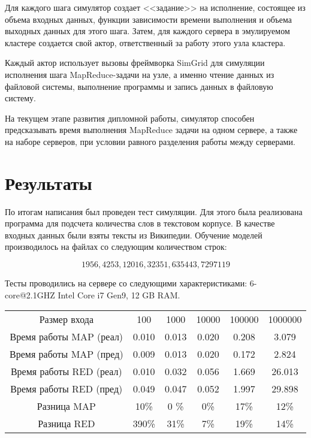 \documentclass[a4paper,12pt]{article}
\begin{document}
    Для каждого шага симулятор создает <<задание>> на исполнение, состоящее из
    объема входных данных, функции зависимости времени выполнения и объема
    выходных данных для этого шага. Затем, для каждого сервера в эмулируемом
    кластере создается свой актор, ответственный за работу этого узла кластера.

    Каждый актор использует вызовы фреймворка SimGrid для симуляции исполнения
    шага MapReduce-задачи на узле, а именно чтение данных из файловой системы,
    выполнение программы и запись данных в файловую систему.

    На текущем этапе развития дипломной работы, симулятор способен предсказывать
    время выполнения MapReduce задачи на одном сервере, а также на наборе
    серверов, при условии равного разделения работы между серверами. 

    \section{Результаты}

    По итогам написания был проведен тест симуляции. Для этого была реализована
    программа для подсчета количества слов в текстовом корпусе. В качестве
    входных данных были взяты тексты из Википедии. Обучение моделей
    производилось на файлах со следующим количеством строк: 

    \begin{equation}
        1956, 4253, 12016, 32351, 635443, 7297119
    \end{equation}
    
     Тесты
    проводились на сервере со следующими характеристиками: 6-core@2.1GHZ Intel
    Core i7 Gen9, 12 GB RAM. 

    \begin{table}[htbp]
    \begin{center}
    \begin{tabular}{c|c|c|c|c|c}
        Размер входа              & 100   & 1000  & 10000 & 100000 & 1000000 \\
        Время работы MAP (реал)   & 0.010 & 0.013 & 0.020 & 0.208  & 3.079   \\
        Время работы MAP (пред)   & 0.009 & 0.013 & 0.020 & 0.172  & 2.824   \\
        Время работы RED (реал)   & 0.010 & 0.032 & 0.056 & 1.669  & 26.013  \\
        Время работы RED (пред)   & 0.049 & 0.047 & 0.052 & 1.997  & 29.898  \\
        Разница MAP               & 10\%  & 0 \%  & 0\%   & 17\%   & 12\%    \\
        Разница RED               & 390\% & 31\%  & 7\%   & 19\%   & 14\%    \\
    \end{tabular}

    \medskip
    \end{center}
    \end{table}
\end{document}
